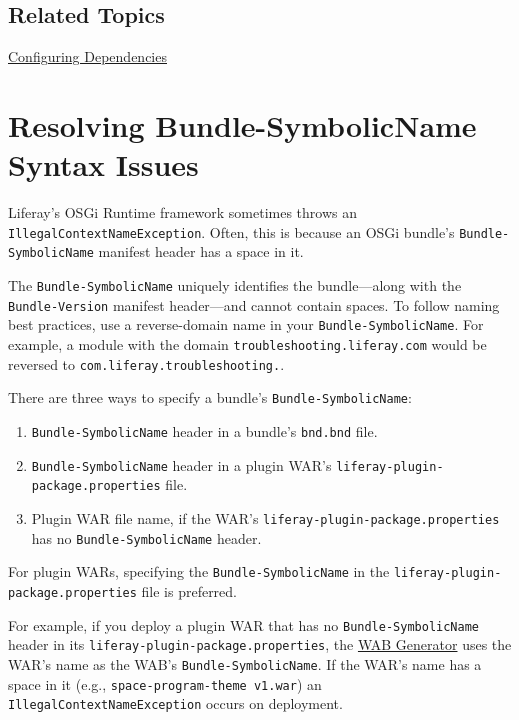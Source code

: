 \section{Related Topics}\label{related-topics-28}

\href{/docs/7-2/customization/-/knowledge_base/c/configuring-dependencies}{Configuring
Dependencies}

\chapter{Resolving Bundle-SymbolicName Syntax
Issues}\label{resolving-bundle-symbolicname-syntax-issues}

Liferay's OSGi Runtime framework sometimes throws an
\texttt{IllegalContextNameException}. Often, this is because an OSGi
bundle's \texttt{Bundle-SymbolicName} manifest header has a space in it.

The \texttt{Bundle-SymbolicName} uniquely identifies the bundle---along
with the \texttt{Bundle-Version} manifest header---and cannot contain
spaces. To follow naming best practices, use a reverse-domain name in
your \texttt{Bundle-SymbolicName}. For example, a module with the domain
\texttt{troubleshooting.liferay.com} would be reversed to
\texttt{com.liferay.troubleshooting.}.

There are three ways to specify a bundle's \texttt{Bundle-SymbolicName}:

\begin{enumerate}
\def\labelenumi{\arabic{enumi}.}
\item
  \texttt{Bundle-SymbolicName} header in a bundle's \texttt{bnd.bnd}
  file.
\item
  \texttt{Bundle-SymbolicName} header in a plugin WAR's
  \texttt{liferay-plugin-package.properties} file.
\item
  Plugin WAR file name, if the WAR's
  \texttt{liferay-plugin-package.properties} has no
  \texttt{Bundle-SymbolicName} header.
\end{enumerate}

For plugin WARs, specifying the \texttt{Bundle-SymbolicName} in the
\texttt{liferay-plugin-package.properties} file is preferred.

For example, if you deploy a plugin WAR that has no
\texttt{Bundle-SymbolicName} header in its
\texttt{liferay-plugin-package.properties}, the
\href{/docs/7-2/customization/-/knowledge_base/c/deploying-wars-wab-generator}{WAB
Generator} uses the WAR's name as the WAB's
\texttt{Bundle-SymbolicName}. If the WAR's name has a space in it (e.g.,
\texttt{space-program-theme\ v1.war}) an
\texttt{IllegalContextNameException} occurs on deployment.

